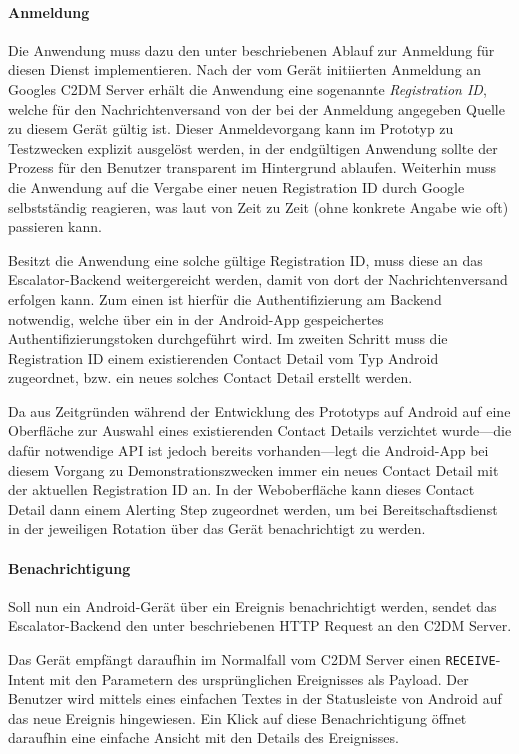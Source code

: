 \documentclass[11pt,utf8,notoc,bibnum,german,final]{zihpub}
\begin{document}
\paragraph{Anmeldung}

Die Anwendung muss dazu den unter \cite{c2dm-lifecycle} beschriebenen Ablauf
zur Anmeldung für diesen Dienst implementieren. Nach der vom Gerät initiierten
Anmeldung an Googles C2DM Server erhält die Anwendung eine sogenannte
\emph{Registration ID}, welche für den Nachrichtenversand von der bei der
Anmeldung angegeben Quelle zu diesem Gerät gültig ist. Dieser Anmeldevorgang
kann im Prototyp zu Testzwecken explizit ausgelöst werden, in der endgültigen
Anwendung sollte der Prozess für den Benutzer transparent im Hintergrund
ablaufen. Weiterhin muss die Anwendung auf die Vergabe einer neuen Registration
ID durch Google selbstständig reagieren, was laut \cite{c2dm-lifecycle} von
Zeit zu Zeit (ohne konkrete Angabe wie oft) passieren kann.

Besitzt die Anwendung eine solche gültige Registration ID, muss diese an das
Escalator-Backend weitergereicht werden, damit von dort der Nachrichtenversand
erfolgen kann. Zum einen ist hierfür die Authentifizierung am Backend
notwendig, welche über ein in der Android-App gespeichertes
Authentifizierungstoken durchgeführt wird. Im zweiten Schritt muss die
Registration ID einem existierenden Contact Detail vom Typ Android zugeordnet,
bzw. ein neues solches Contact Detail erstellt werden.

Da aus Zeitgründen während der Entwicklung des Prototyps auf Android auf eine
Oberfläche zur Auswahl eines existierenden Contact Details verzichtet wurde—die
dafür notwendige API ist jedoch bereits vorhanden—legt die Android-App bei
diesem Vorgang zu Demonstrationszwecken immer ein neues Contact Detail mit der
aktuellen Registration ID an. In der Weboberfläche kann dieses Contact Detail
dann einem Alerting Step zugeordnet werden, um bei Bereitschaftsdienst in der
jeweiligen Rotation über das Gerät benachrichtigt zu werden.

\paragraph{Benachrichtigung}
\label{android-notification}

Soll nun ein Android-Gerät über ein Ereignis benachrichtigt werden, sendet das
Escalator-Backend den unter \cite{c2dm-server} beschriebenen HTTP Request an
den C2DM Server.

Das Gerät empfängt daraufhin im Normalfall vom C2DM Server einen
\texttt{RECEIVE}-Intent mit den Parametern des ursprünglichen Ereignisses als
Payload. Der Benutzer wird mittels eines einfachen Textes in der Statusleiste
von Android auf das neue Ereignis hingewiesen. Ein Klick auf diese
Benachrichtigung öffnet daraufhin eine einfache Ansicht mit den Details des
Ereignisses.
\end{document}
